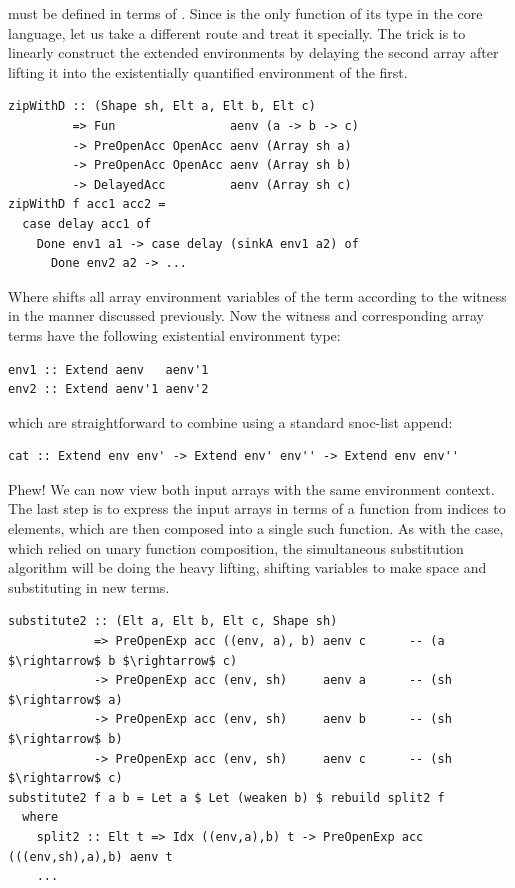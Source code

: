  must be defined in terms of . Since
 is the only function of its type in the core language, let us
take a different route and treat it specially. The trick is to linearly
construct the extended environments by delaying the second array after lifting
it into the existentially quantified environment of the first.
%
\begin{lstlisting}[style=haskell]
zipWithD :: (Shape sh, Elt a, Elt b, Elt c)
         => Fun                aenv (a -> b -> c)
         -> PreOpenAcc OpenAcc aenv (Array sh a)
         -> PreOpenAcc OpenAcc aenv (Array sh b)
         -> DelayedAcc         aenv (Array sh c)
zipWithD f acc1 acc2 =
  case delay acc1 of
    Done env1 a1 -> case delay (sinkA env1 a2) of
      Done env2 a2 -> ...
\end{lstlisting}
%
Where  shifts all array environment variables of the term
according to the witness  in the manner discussed previously. Now
the  witness and corresponding array terms have the following
existential environment type:
%
\begin{lstlisting}[style=haskell]
env1 :: Extend aenv   aenv'1
env2 :: Extend aenv'1 aenv'2
\end{lstlisting}
%
which are straightforward to combine using a standard snoc-list append:
%
\begin{lstlisting}[style=haskell]
cat :: Extend env env' -> Extend env' env'' -> Extend env env''
\end{lstlisting}
%
Phew! We can now view both input arrays with the same environment context. The
last step is to express the input arrays in terms of a function from indices to
elements, which are then composed into a single such function. As with the
 case, which relied on unary function composition, the simultaneous
substitution algorithm will be doing the heavy lifting, shifting variables to
make space and substituting in new terms.
%
\begin{lstlisting}[style=haskell]
substitute2 :: (Elt a, Elt b, Elt c, Shape sh)
            => PreOpenExp acc ((env, a), b) aenv c      -- (a $\rightarrow$ b $\rightarrow$ c)
            -> PreOpenExp acc (env, sh)     aenv a      -- (sh $\rightarrow$ a)
            -> PreOpenExp acc (env, sh)     aenv b      -- (sh $\rightarrow$ b)
            -> PreOpenExp acc (env, sh)     aenv c      -- (sh $\rightarrow$ c)
substitute2 f a b = Let a $ Let (weaken b) $ rebuild split2 f
  where
    split2 :: Elt t => Idx ((env,a),b) t -> PreOpenExp acc (((env,sh),a),b) aenv t
    ...
\end{lstlisting}

